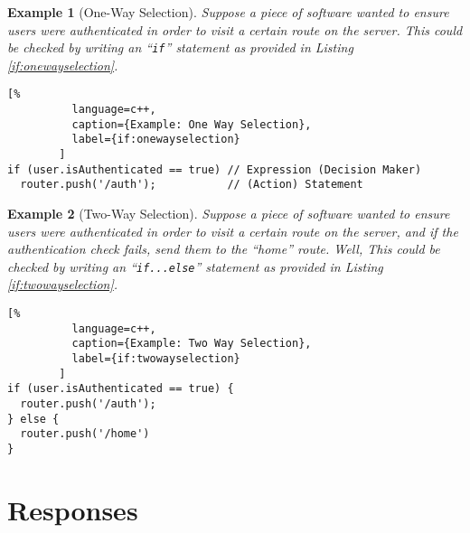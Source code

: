 \documentclass[12pt]{report}
\theoremstyle{definition}
\theoremstyle{plain}
\theoremstyle{plain}
\newtheorem*{examp*}{Example}
\begin{document}
        \begin{examp*}[One-Way Selection]
          Suppose a piece of software wanted to ensure users were authenticated
            in order to visit a certain route on the server. This could be
            checked by writing an ``\texttt{if}'' statement as provided in
            Listing \ref{if:onewayselection}.
        \end{examp*}

        \begin{lstlisting}[%
          language=c++,
          caption={Example: One Way Selection},
          label={if:onewayselection}
        ]
if (user.isAuthenticated == true) // Expression (Decision Maker)
  router.push('/auth');           // (Action) Statement
        \end{lstlisting}

        \begin{examp*}[Two-Way Selection]
          Suppose a piece of software wanted to ensure users were authenticated
            in order to visit a certain route on the server, and \emph{if the
            authentication check fails}, send them to the ``home'' route. Well,
            This could be checked by writing an ``\texttt{if...else}'' statement
            as provided in Listing \ref{if:twowayselection}.
        \end{examp*}

        \begin{lstlisting}[%
          language=c++,
          caption={Example: Two Way Selection},
          label={if:twowayselection}
        ]
if (user.isAuthenticated == true) {
  router.push('/auth');
} else {
  router.push('/home')
}
        \end{lstlisting}




  \newpage
  \part{Responses}





  \newpage
  \nocite{malik_2015}
  \printbibliography[
    heading=bibintoc,
    title={Bibliography}
  ]
\end{document}
